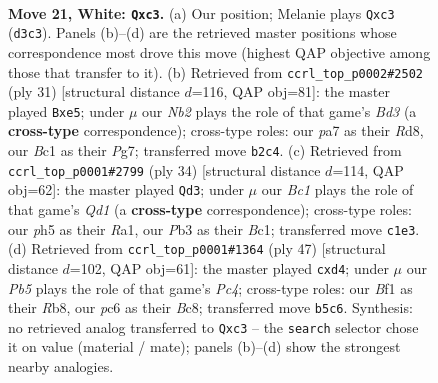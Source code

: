 \documentclass[11pt]{article}
\begin{document}
\clearpage

\begin{figure}[p]\centering
\begin{subfigure}{0.46\textwidth}\centering
\resizebox{\linewidth}{!}{%
\newchessgame
\chessboard[
  setfen={2r1b1k1/p1qr1pp1/n1p1p3/1P5p/3P1Pn1/1PbQ2P1/1N2P2P/R1B1RBK1 w - - 0 21},
  showmover=false,
  pgfstyle=straightmove, color=movearrow, markmove={d3-c3}
]}
\caption{}
\end{subfigure}\hfill
\begin{subfigure}{0.46\textwidth}\centering
\resizebox{\linewidth}{!}{%
\newchessgame
\chessboard[
  setfen={r1br2k1/2q2ppp/p2bpn2/3PB3/Np1Q4/1N3P2/PPP3PP/1K1R1B1R b - - 0 16},
  showmover=false,
  pgfstyle=straightmove, color=movearrow, markmove={d6-e5}
]}
\caption{}
\end{subfigure}
\\[4pt]
\begin{subfigure}{0.46\textwidth}\centering
\resizebox{\linewidth}{!}{%
\newchessgame
\chessboard[
  setfen={r1q1kb1r/5p1p/p2pp1p1/5nPP/1R6/P1P2b1B/1P2NP2/R1BQK3 w Qkq - 0 18},
  showmover=false,
  pgfstyle=straightmove, color=movearrow, markmove={d1-d3}
]}
\caption{}
\end{subfigure}\hfill
\begin{subfigure}{0.46\textwidth}\centering
\resizebox{\linewidth}{!}{%
\newchessgame
\chessboard[
  setfen={1rb2r1k/p3b1p1/2q1p1Bp/1ppn2NQ/3B1P2/P5N1/1PP3PP/R4R1K b - - 0 24},
  showmover=false,
  pgfstyle=straightmove, color=movearrow, markmove={c5-d4}
]}
\caption{}
\end{subfigure}
\caption{\textbf{Move 21, White: \texttt{Qxc3}.} (a) Our position; Melanie plays \texttt{Qxc3} (\texttt{d3c3}). Panels (b)--(d) are the retrieved master positions whose correspondence most drove this move (highest QAP objective among those that transfer to it). (b) Retrieved from \texttt{ccrl\_top\_p0002\#2502} (ply 31) [structural distance $d$=116, QAP obj=81]: the master played \texttt{Bxe5}; under $\mu$ our \emph{Nb2} plays the role of that game's \emph{Bd3} (a \textbf{cross-type} correspondence); cross-type roles: our \emph{p}a7 as their \emph{R}d8, our \emph{B}c1 as their \emph{P}g7; transferred move \texttt{b2c4}. (c) Retrieved from \texttt{ccrl\_top\_p0001\#2799} (ply 34) [structural distance $d$=114, QAP obj=62]: the master played \texttt{Qd3}; under $\mu$ our \emph{Bc1} plays the role of that game's \emph{Qd1} (a \textbf{cross-type} correspondence); cross-type roles: our \emph{p}h5 as their \emph{R}a1, our \emph{P}b3 as their \emph{B}c1; transferred move \texttt{c1e3}. (d) Retrieved from \texttt{ccrl\_top\_p0001\#1364} (ply 47) [structural distance $d$=102, QAP obj=61]: the master played \texttt{cxd4}; under $\mu$ our \emph{Pb5} plays the role of that game's \emph{Pc4}; cross-type roles: our \emph{B}f1 as their \emph{R}b8, our \emph{p}c6 as their \emph{B}c8; transferred move \texttt{b5c6}. Synthesis: no retrieved analog transferred to \texttt{Qxc3} -- the \texttt{search} selector chose it on value (material / mate); panels (b)--(d) show the strongest nearby analogies.}
\label{fig:thought-m40}
\end{figure}
\end{document}
